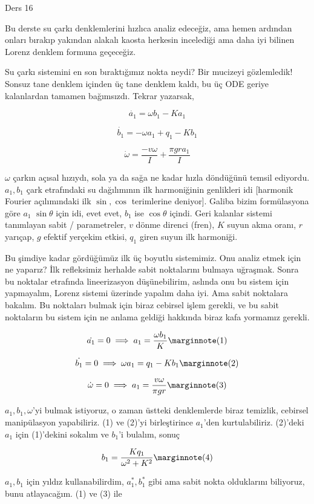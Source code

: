 \documentclass[12pt,fleqn]{article}\usepackage{../../common}
\begin{document}
Ders 16

Bu derste su çarkı denklemlerini hızlıca analiz edeceğiz, ama hemen
ardından onları bırakıp yakından alakalı kaosta herkesin incelediği ama
daha iyi bilinen Lorenz denklem formuna geçeceğiz.

Su çarkı sistemini en son bıraktığımız nokta neydi? Bir mucizeyi
gözlemledik! Sonsuz tane denklem içinden üç tane denklem kaldı, bu üç ODE
geriye kalanlardan tamamen bağımsızdı. Tekrar yazarsak,

$$ \dot{a_1} = \omega b_1 - K a_1 $$

$$ \dot{b_1} = -\omega a_1 + q_1 - Kb_1 $$

$$ \dot{\omega} = \frac{-v\omega}{I} + \frac{\pi gr a_1}{I} $$

$\omega$ çarkın açısal hızıydı, sola ya da sağa ne kadar hızla döndüğünü
temsil ediyordu. $a_1,b_1$ çark etrafındaki su dağılımının ilk harmoniğinin
genlikleri idi [harmonik Fourier açılımındaki ilk $\sin,\cos$ terimlerine
deniyor]. Galiba bizim formülasyona göre $a_1$ $\sin\theta$ için idi, evet
evet, $b_1$ ise $\cos\theta$ içindi. Geri kalanlar sistemi tanımlayan sabit
/ parametreler, $v$ dönme direnci (fren), $K$ suyun akma oranı, $r$
yarıçap, $g$ efektif yerçekim etkisi, $q_1$ giren suyun ilk harmoniği. 

Bu şimdiye kadar gördüğümüz ilk üç boyutlu sistemimiz. Onu analiz etmek
için ne yaparız? İlk refleksimiz herhalde sabit noktalarını bulmaya
uğraşmak. Sonra bu noktalar etrafında lineerizasyon düşünebilirim, aslında
onu bu sistem için yapmayalım, Lorenz sistemi üzerinde yapalım daha
iyi. Ama sabit noktalara bakalım. Bu noktaları bulmak için biraz cebirsel
işlem gerekli, ve bu sabit noktaların bu sistem için ne anlama geldiği
hakkında biraz kafa yormamız gerekli.

$$ 
\dot{a_1} = 0 \implies a_1 = \frac{\omega b_1}{K}  
\mlabel{1} 
$$

$$ 
\dot{b_1} = 0 \implies \omega a_1 = q_1 - K b_1 
\mlabel{2} 
$$

$$ 
\dot{\omega} = 0 \implies a_1 = \frac{v \omega}{\pi gr} 
\mlabel{3}
$$

$a_1,b_1,\omega$'yi bulmak istiyoruz, o zaman üstteki denklemlerde biraz
temizlik, cebirsel manipülasyon yapabiliriz. (1) ve (2)'yi birleştirince
$a_1$'den kurtulabiliriz. (2)'deki $a_1$ için (1)'dekini sokalım ve $b_1$'i
bulalım, sonuç

$$ 
b_1 = \frac{K q_1}{\omega^2 + K^2}  
\mlabel{4} 
$$

$a_1,b_1$ için yıldız kullanabilirdim, $a_1^\ast,b_1^\ast$ gibi ama sabit nokta
olduklarını biliyoruz, bunu atlayacağım. (1) ve (3) ile
\end{document}
